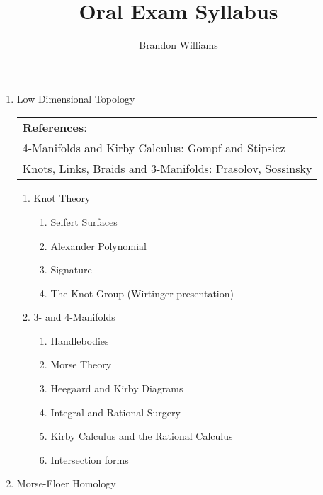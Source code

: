 



\topmargin -100pt     
\textheight 10in



\title{\Large Oral Exam Syllabus}
\author{\large Brandon Williams}

\maketitle

\begin{enumerate}

\item Low Dimensional Topology

\footnotesize
\begin{tabular}{l}
\textbf{References}: \\
4-Manifolds and Kirby Calculus: Gompf and Stipsicz \\
Knots, Links, Braids and 3-Manifolds: Prasolov, Sossinsky 
\end{tabular}
\normalsize

\begin{enumerate}
  \item Knot Theory
  \begin{enumerate}
    \item Seifert Surfaces
    \item Alexander Polynomial
    \item Signature
    \item The Knot Group (Wirtinger presentation)
  \end{enumerate}
  \item 3- and 4-Manifolds
  \begin{enumerate}
    \item Handlebodies
    \item Morse Theory
    \item Heegaard and Kirby Diagrams
    \item Integral and Rational Surgery
    \item Kirby Calculus and the Rational Calculus
    \item Intersection forms
  \end{enumerate}
\end{enumerate}

\item Morse-Floer Homology


\end{enumerate}
